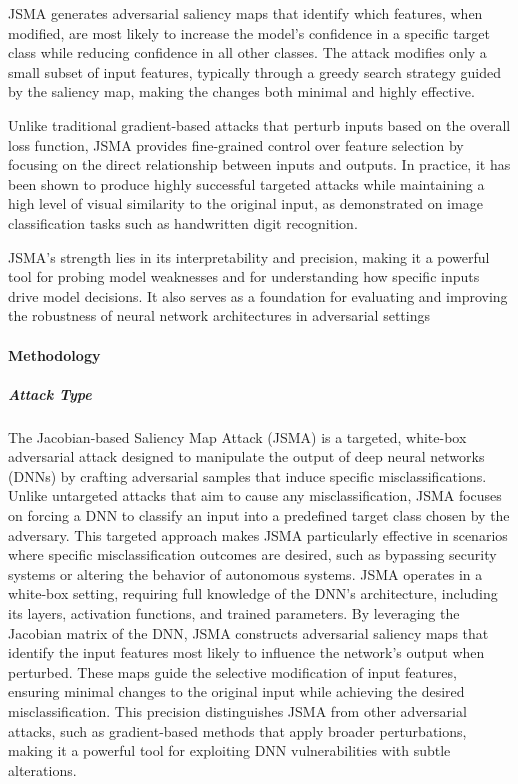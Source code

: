 \documentclass[../main.tex]{subfiles}
\begin{document}
JSMA generates adversarial saliency maps that identify which features, when modified, are most likely to increase the model's confidence in a specific target class while reducing confidence in all other classes. The attack modifies only a small subset of input features, typically through a greedy search strategy guided by the saliency map, making the changes both minimal and highly effective.

Unlike traditional gradient-based attacks that perturb inputs based on the overall loss function, JSMA provides fine-grained control over feature selection by focusing on the direct relationship between inputs and outputs. In practice, it has been shown to produce highly successful targeted attacks while maintaining a high level of visual similarity to the original input, as demonstrated on image classification tasks such as handwritten digit recognition.

JSMA's strength lies in its interpretability and precision, making it a powerful tool for probing model weaknesses and for understanding how specific inputs drive model decisions. It also serves as a foundation for evaluating and improving the robustness of neural network architectures in adversarial settings 
\cite{papernot2016limitations}

\paragraph{Methodology}
\subparagraph{Attack Type}



The Jacobian-based Saliency Map Attack (JSMA) is a targeted, white-box adversarial attack designed to manipulate the output of deep neural networks (DNNs) by crafting adversarial samples that induce specific misclassifications. Unlike untargeted attacks that aim to cause any misclassification, JSMA focuses on forcing a DNN to classify an input into a predefined target class chosen by the adversary. This targeted approach makes JSMA particularly effective in scenarios where specific misclassification outcomes are desired, such as bypassing security systems or altering the behavior of autonomous systems. JSMA operates in a white-box setting, requiring full knowledge of the DNN’s architecture, including its layers, activation functions, and trained parameters. By leveraging the Jacobian matrix of the DNN, JSMA constructs adversarial saliency maps that identify the input features most likely to influence the network’s output when perturbed. These maps guide the selective modification of input features, ensuring minimal changes to the original input while achieving the desired misclassification. This precision distinguishes JSMA from other adversarial attacks, such as gradient-based methods that apply broader perturbations, making it a powerful tool for exploiting DNN vulnerabilities with subtle alterations.
\end{document}
